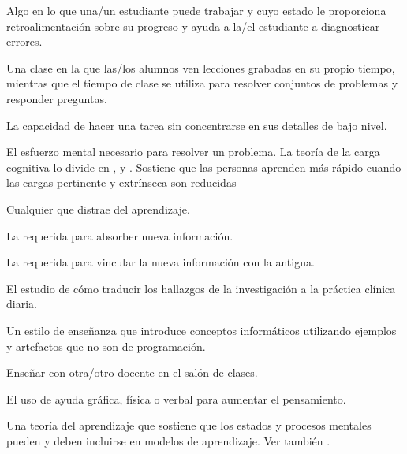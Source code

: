 \begin{description}
 Algo en lo que una/un estudiante puede trabajar
y cuyo estado le  proporciona retroalimentación sobre su  progreso y ayuda a la/el estudiante a diagnosticar errores.

 Una clase en la que las/los alumnos
ven lecciones grabadas en su propio tiempo, mientras que el tiempo de clase
se utiliza para resolver conjuntos de problemas y responder preguntas.

 La capacidad de hacer una tarea sin
concentrarse en sus detalles de bajo nivel.

 El esfuerzo mental necesario para resolver un problema.
La teoría de la carga cognitiva lo divide en
 ,
y .
Sostiene que las personas aprenden más rápido cuando las cargas pertinente y extrínseca son reducidas

 Cualquier 
que distrae del aprendizaje.

 La 
requerida para absorber nueva información.

 La 
requerida para vincular la nueva información con la antigua.

 El estudio de cómo traducir
los hallazgos de la investigación a la práctica clínica diaria.

 Un estilo de enseñanza que introduce
conceptos informáticos utilizando ejemplos y artefactos que no son de programación.

 Enseñar con otra/otro docente en el
salón de clases.

 El uso de ayuda gráfica,
física o verbal para aumentar el pensamiento.

 Una teoría del aprendizaje que sostiene que los estados y procesos mentales pueden y deben incluirse en modelos de aprendizaje. Ver también
.


\end{description}
